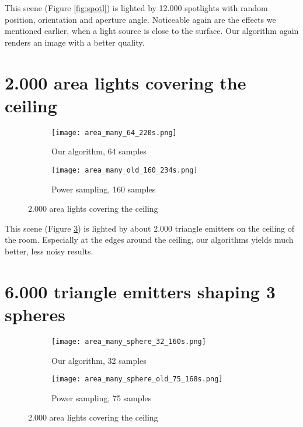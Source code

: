 This scene (Figure \ref{fig:spotl}) is lighted by 12.000 spotlights with random position, orientation and aperture angle. Noticeable again are the effects we mentioned earlier, when a light source is close to the surface. Our algorithm again renders an image with a better quality.

\section{2.000 area lights covering the ceiling}

\begin{figure}
	\centering
	\begin{subfigure}{.5\textwidth}
		\centering
		\texttt{[image: area\_many\_64\_220s.png]}
		\caption{Our algorithm, 64 samples}
		\label{fig:area1}
	\end{subfigure}%
	\begin{subfigure}{.5\textwidth}
		\centering
		\texttt{[image: area\_many\_old\_160\_234s.png]}
		\caption{Power sampling, 160 samples}
		\label{fig:area2}
	\end{subfigure}
	\caption{2.000 area lights covering the ceiling}
	\label{fig:area}
\end{figure}

This scene (Figure \ref{fig:area}) is lighted by about 2.000 triangle emitters on the ceiling of the room. Especially at the edges around the ceiling, our algorithms yields much better, less noisy results.

\section{6.000 triangle emitters shaping 3 spheres}

\begin{figure}
	\centering
	\begin{subfigure}{.5\textwidth}
		\centering
		\texttt{[image: area\_many\_sphere\_32\_160s.png]}
		\caption{Our algorithm, 32 samples}
		\label{fig:area3}
	\end{subfigure}%
	\begin{subfigure}{.5\textwidth}
		\centering
		\texttt{[image: area\_many\_sphere\_old\_75\_168s.png]}
		\caption{Power sampling, 75 samples}
		\label{fig:area4}
	\end{subfigure}
	\caption{2.000 area lights covering the ceiling}
	\label{fig:areal}
\end{figure}

